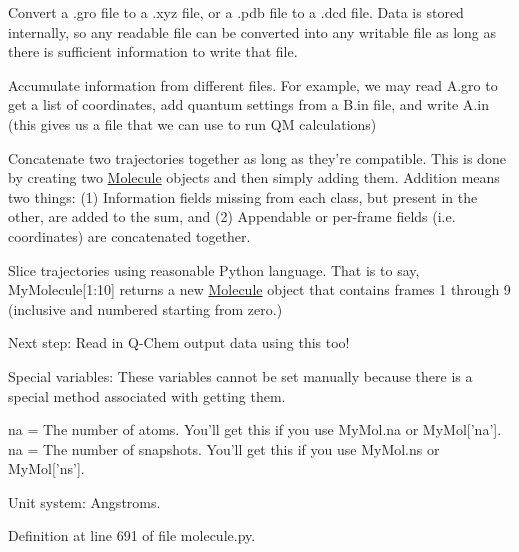 \begin{DoxyItemize}
\item Convert a .gro file to a .xyz file, or a .pdb file to a .dcd file. Data is stored internally, so any readable file can be converted into any writable file as long as there is sufficient information to write that file.
\item Accumulate information from different files. For example, we may read A.\-gro to get a list of coordinates, add quantum settings from a B.\-in file, and write A.\-in (this gives us a file that we can use to run Q\-M calculations)
\item Concatenate two trajectories together as long as they're compatible. This is done by creating two \hyperlink{classforcebalance_1_1molecule_1_1Molecule}{Molecule} objects and then simply adding them. Addition means two things\-: (1) Information fields missing from each class, but present in the other, are added to the sum, and (2) Appendable or per-\/frame fields (i.\-e. coordinates) are concatenated together.
\item Slice trajectories using reasonable Python language. That is to say, My\-Molecule\mbox{[}1\-:10\mbox{]} returns a new \hyperlink{classforcebalance_1_1molecule_1_1Molecule}{Molecule} object that contains frames 1 through 9 (inclusive and numbered starting from zero.)
\end{DoxyItemize}

Next step\-: Read in Q-\/\-Chem output data using this too!

Special variables\-: These variables cannot be set manually because there is a special method associated with getting them.

na = The number of atoms. You'll get this if you use My\-Mol.\-na or My\-Mol\mbox{[}'na'\mbox{]}. na = The number of snapshots. You'll get this if you use My\-Mol.\-ns or My\-Mol\mbox{[}'ns'\mbox{]}.

Unit system\-: Angstroms. 

Definition at line 691 of file molecule.\-py.



